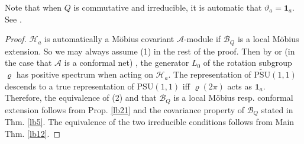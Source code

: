 \documentclass[11pt,b5paper,notitlepage]{article}
\theoremstyle{definition}
\theoremstyle{plain}
\newcommand{\mc}{\mathcal}
\newcommand{\id}{\mathbf{1}}
\newcommand{\PSU}{\mathrm{PSU}(1,1)}
\newcommand{\UPSU}{\widetilde{\mathrm{PSU}}(1,1)}
\numberwithin{equation}{section}
\begin{document}
Note that when $Q$ is commutative and irreducible, it is automatic that $\vartheta_a=\id_a$. See \cite[Prop. 2.22]{CGGH23}.


\begin{proof}

	
$\mc H_a$ is automatically a M\"obius  covariant $\mc A$-module if $\mc B_Q$ is a local M\"obius extension. So we may always assume (1) in the rest of  the proof. Then by \cite[Cor. 4.4]{BCL98} or (in the case that $\mc A$ is a conformal net) \cite{Wei06}, the generator $L_0$ of the rotation subgroup $\varrho$ has positive spectrum when acting on $\mc H_a$. The representation of $\UPSU$ descends to a true representation of $\PSU$ iff $\varrho(2\pi)$ acts as $\id_a$. Therefore, the equivalence of (2) and that $\mc B_Q$ is a local M\"obius resp. conformal extension follows from Prop. \ref{lb21}  and the covariance property of $\mc B_Q$ stated in Thm. \ref{lb5}. The equivalence of the two irreducible conditions follows from Main Thm. \ref{lb12}.
\end{proof}
\end{document}
